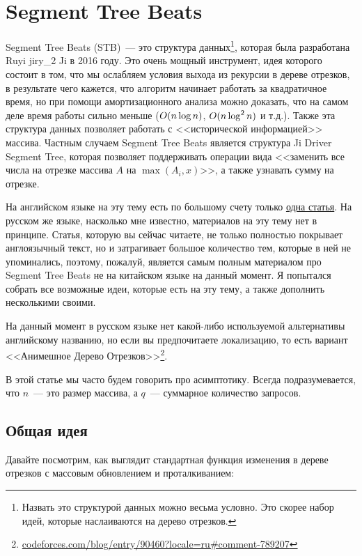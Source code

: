 \chapter{Segment Tree Beats}


Segment Tree Beats (STB)~--- это структура данных\footnote{Назвать это структурой данных можно весьма условно. Это скорее набор идей, которые наслаиваются на дерево отрезков.}, которая была разработана Ruyi jiry\_2 Ji в 2016 году. Это очень мощный инструмент, идея которого состоит в том, что мы ослабляем условия выхода из рекурсии в дереве отрезков, в результате чего кажется, что алгоритм начинает работать за квадратичное время, но при помощи амортизационного анализа можно доказать, что на самом деле время работы сильно меньше ($O(n \log n)$, $O(n \log^2 n)$ и т.д.). Также эта структура данных позволяет работать с <<исторической информацией>> массива. Частным случаем Segment Tree Beats является структура Ji Driver Segment Tree, которая позволяет поддерживать операции вида <<заменить все числа на отрезке массива $A$ на $\max(A_i, x)$>>, а также узнавать сумму на отрезке.

На английском языке на эту тему есть по большому счету только \href{https://codeforces.com/blog/entry/57319}{одна статья}. На русском же языке, насколько мне известно, материалов на эту тему нет в принципе. Статья, которую вы сейчас читаете, не только полностью покрывает англоязычный текст, но и затрагивает большое количество тем, которые в ней не упоминались, поэтому, пожалуй, является самым полным материалом про Segment Tree Beats не на китайском языке на данный момент. Я попытался собрать все возможные идеи, которые есть на эту тему, а также дополнить несколькими своими.

На данный момент в русском языке нет какой-либо используемой альтернативы английскому названию, но если вы предпочитаете локализацию, то есть вариант <<Анимешное Дерево Отрезков>>\footnote{\href{https://codeforces.com/blog/entry/90460?locale=ru\#comment-789207}{codeforces.com/blog/entry/90460?locale=ru\#comment-789207}}.

В этой статье мы часто будем говорить про асимптотику. Всегда подразумевается, что $n$~--- это размер массива, а $q$~--- суммарное количество запросов. 

\section{Общая идея}

Давайте посмотрим, как выглядит стандартная функция изменения в дереве отрезков с массовым обновлением и проталкиванием:

